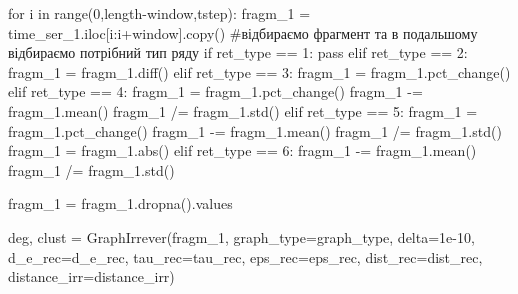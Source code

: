 \documentclass[
  letterpaper,
]{report}
\newenvironment{Shaded}{\begin{snugshade}}{\end{snugshade}}
\newcommand{\BuiltInTok}[1]{\textcolor[rgb]{0.00,0.23,0.31}{#1}}
\newcommand{\CommentTok}[1]{\textcolor[rgb]{0.37,0.37,0.37}{#1}}
\newcommand{\ControlFlowTok}[1]{\textcolor[rgb]{0.00,0.23,0.31}{#1}}
\newcommand{\DecValTok}[1]{\textcolor[rgb]{0.68,0.00,0.00}{#1}}
\newcommand{\FloatTok}[1]{\textcolor[rgb]{0.68,0.00,0.00}{#1}}
\newcommand{\KeywordTok}[1]{\textcolor[rgb]{0.00,0.23,0.31}{#1}}
\newcommand{\NormalTok}[1]{\textcolor[rgb]{0.00,0.23,0.31}{#1}}
\newcommand{\OperatorTok}[1]{\textcolor[rgb]{0.37,0.37,0.37}{#1}}
\begin{document}
\begin{Shaded}
\begin{Highlighting}[]
\ControlFlowTok{for}\NormalTok{ i }\KeywordTok{in} \BuiltInTok{range}\NormalTok{(}\DecValTok{0}\NormalTok{,length}\OperatorTok{{-}}\NormalTok{window,tstep):}
\NormalTok{    fragm\_1 }\OperatorTok{=}\NormalTok{ time\_ser\_1.iloc[i:i}\OperatorTok{+}\NormalTok{window].copy() }\CommentTok{\#відбираємо фрагмент та в подальшому відбираємо потрібний тип ряду}
    \ControlFlowTok{if}\NormalTok{ ret\_type }\OperatorTok{==} \DecValTok{1}\NormalTok{:}
        \ControlFlowTok{pass}
    \ControlFlowTok{elif}\NormalTok{ ret\_type }\OperatorTok{==} \DecValTok{2}\NormalTok{:}
\NormalTok{        fragm\_1 }\OperatorTok{=}\NormalTok{ fragm\_1.diff()}
    \ControlFlowTok{elif}\NormalTok{ ret\_type }\OperatorTok{==} \DecValTok{3}\NormalTok{:}
\NormalTok{        fragm\_1 }\OperatorTok{=}\NormalTok{ fragm\_1.pct\_change()}
    \ControlFlowTok{elif}\NormalTok{ ret\_type }\OperatorTok{==} \DecValTok{4}\NormalTok{:}
\NormalTok{        fragm\_1 }\OperatorTok{=}\NormalTok{ fragm\_1.pct\_change()}
\NormalTok{        fragm\_1 }\OperatorTok{{-}=}\NormalTok{ fragm\_1.mean()}
\NormalTok{        fragm\_1 }\OperatorTok{/=}\NormalTok{ fragm\_1.std()}
    \ControlFlowTok{elif}\NormalTok{ ret\_type }\OperatorTok{==} \DecValTok{5}\NormalTok{: }
\NormalTok{        fragm\_1 }\OperatorTok{=}\NormalTok{ fragm\_1.pct\_change()}
\NormalTok{        fragm\_1 }\OperatorTok{{-}=}\NormalTok{ fragm\_1.mean()}
\NormalTok{        fragm\_1 }\OperatorTok{/=}\NormalTok{ fragm\_1.std()}
\NormalTok{        fragm\_1 }\OperatorTok{=}\NormalTok{ fragm\_1.}\BuiltInTok{abs}\NormalTok{()}
    \ControlFlowTok{elif}\NormalTok{ ret\_type }\OperatorTok{==} \DecValTok{6}\NormalTok{:}
\NormalTok{        fragm\_1 }\OperatorTok{{-}=}\NormalTok{ fragm\_1.mean()}
\NormalTok{        fragm\_1 }\OperatorTok{/=}\NormalTok{ fragm\_1.std()}
        
\NormalTok{    fragm\_1 }\OperatorTok{=}\NormalTok{ fragm\_1.dropna().values}
        
\NormalTok{    deg, clust }\OperatorTok{=}\NormalTok{ GraphIrrever(fragm\_1, }
\NormalTok{                                    graph\_type}\OperatorTok{=}\NormalTok{graph\_type, }
\NormalTok{                                    delta}\OperatorTok{=}\FloatTok{1e{-}10}\NormalTok{, }
\NormalTok{                                    d\_e\_rec}\OperatorTok{=}\NormalTok{d\_e\_rec, }
\NormalTok{                                    tau\_rec}\OperatorTok{=}\NormalTok{tau\_rec, }
\NormalTok{                                    eps\_rec}\OperatorTok{=}\NormalTok{eps\_rec, }
\NormalTok{                                    dist\_rec}\OperatorTok{=}\NormalTok{dist\_rec, }
\NormalTok{                                    distance\_irr}\OperatorTok{=}\NormalTok{distance\_irr)  }
    

\end{Highlighting}
\end{Shaded}
\end{document}

